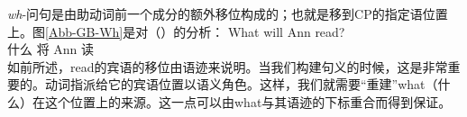 \emph{wh}-问句是由助动词前一个成分的额外移位构成的；也就是移到CP的指定语位置上。图\vref{Abb-GB-Wh}是对（）的分析：
\ea
\gll What will Ann read?\\
      什么 将 Ann 读\\
\z
%
如前所述，read的宾语的移位由语迹来说明。当我们构建句义的时候，这是非常重要的。动词指派给它的宾语位置以语义角色。这样，我们就需要``重建''what（什么）在这个位置上的来源。这一点可以由what与其语迹的下标重合而得到保证。

